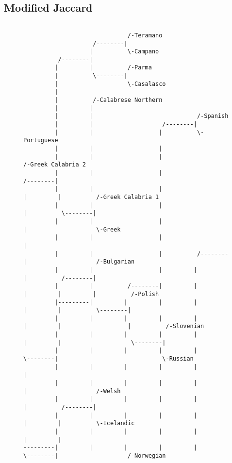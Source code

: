 \subsection{Modified Jaccard}
\begin{figure}[!htb]
\begin{center}
{
\selectfont
\begin{verbatim}

                              /-Teramano
                    /--------|
                   |          \-Campano
          /--------|
         |         |          /-Parma
         |          \--------|
         |                    \-Casalasco
         |
         |          /-Calabrese Northern
         |         |
         |         |                              /-Spanish
         |         |                    /--------|
         |         |                   |          \-Portuguese
         |         |                   |
         |         |                   |                              /-Greek Calabria 2
         |         |                   |                    /--------|
         |         |                   |                   |         |          /-Greek Calabria 1
         |         |                   |                   |          \--------|
         |         |                   |                   |                    \-Greek
         |         |                   |                   |
         |         |                   |          /--------|                    /-Bulgarian
         |         |                   |         |         |          /--------|
         |         |          /--------|         |         |         |         |          /-Polish
         |---------|         |         |         |         |         |          \--------|
         |         |         |         |         |         |         |                   |          /-Slovenian
         |         |         |         |         |         |         |                    \--------|
         |         |         |         |         |          \--------|                              \-Russian
         |         |         |         |         |                   |
         |         |         |         |         |                   |                    /-Welsh
         |         |         |         |         |                   |          /--------|
         |         |         |         |         |                   |         |          \-Icelandic
         |         |         |         |         |                   |         |
---------|         |         |         |         |                    \--------|                    /-Norwegian

\end{verbatim}}
\end{center}
\end{figure}
